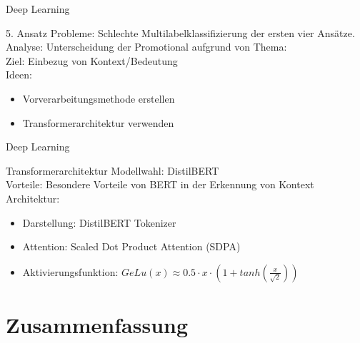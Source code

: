 \documentclass[aspectratio=169]{beamer} %
\begin{document}
\begin{frame}{Deep Learning}
    \begin{block}{5. Ansatz}
        Probleme: Schlechte Multilabelklassifizierung der ersten vier Ansätze. \\
        Analyse: Unterscheidung der Promotional aufgrund von Thema: \\
        Ziel:
        Einbezug von Kontext/Bedeutung \\
        Ideen:
        \begin{itemize}
            \item Vorverarbeitungsmethode erstellen
            \item Transformerarchitektur verwenden
        \end{itemize}
    \end{block}
\end{frame}

\begin{frame}{Deep Learning}
    \begin{block}{Transformerarchitektur}
        Modellwahl: DistilBERT \\
        Vorteile: Besondere Vorteile von BERT in der Erkennung von Kontext \\
        Architektur:
        \begin{itemize}
            \item Darstellung: DistilBERT Tokenizer
            \item Attention: Scaled Dot Product Attention (SDPA)
            \item Aktivierungsfunktion: $GeLu(x) \approx {0.5 \cdot x \cdot (1+ tanh({\frac{x}{\sqrt{2}}}))} $
        \end{itemize}
    \end{block}
\end{frame}

\section{Zusammenfassung}
\end{document}

